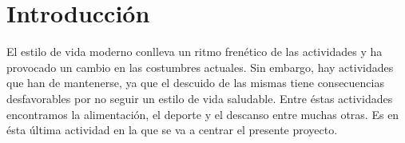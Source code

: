 \documentclass[11pt,openany]{book}
\begin{document}


\tableofcontents %
\listoffigures %
\cleardoublepage
{} %
\listoftables %

\chapter{Introducción}

El estilo de vida moderno conlleva un ritmo frenético de las actividades y ha provocado un cambio en las costumbres actuales. Sin embargo, hay actividades que han de mantenerse, ya que el descuido de las mismas tiene consecuencias desfavorables por no seguir un estilo de vida saludable. Entre éstas actividades encontramos la alimentación, el deporte y el descanso entre muchas otras. Es en ésta última actividad en la que se va a centrar el presente proyecto.
\end{document}
